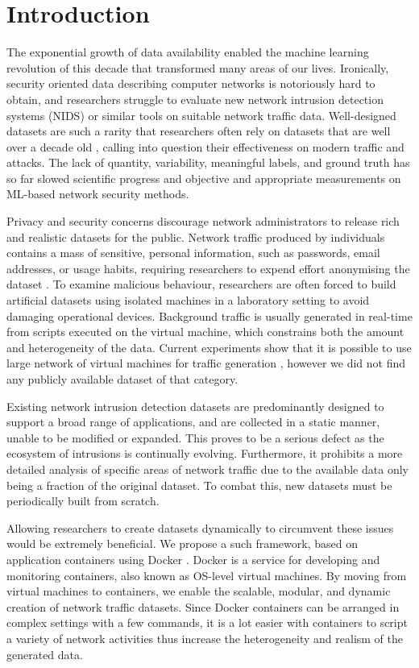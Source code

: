 \section{Introduction}


The exponential growth of data availability enabled the machine learning revolution of this decade that transformed many areas of our lives. Ironically, security oriented data describing computer networks is notoriously hard to obtain, and researchers struggle to evaluate new network intrusion detection systems (NIDS) or similar tools on suitable network traffic data.
Well-designed datasets are such a rarity that researchers often rely on datasets that are well over a decade old \cite{tavallaee2009detailed, kayacik2005selecting}, calling into question their effectiveness on modern traffic and attacks. The lack of quantity, variability, meaningful labels, and ground truth has so far slowed scientific progress and objective and appropriate measurements on ML-based network security methods.


Privacy and security concerns discourage network administrators to release rich and realistic datasets for the public. Network traffic produced by individuals contains a mass of sensitive, personal information, such as passwords, email addresses, or usage habits, requiring researchers to expend effort anonymising the dataset \cite{mirsky2016sherlock}. To examine malicious behaviour, researchers are often forced to build artificial datasets using isolated machines in a laboratory setting to avoid damaging operational devices. Background traffic is usually generated in real-time from scripts executed on the virtual machine, which constrains both the amount and heterogeneity of the data. Current experiments show that it is possible to use large network of virtual machines for traffic generation \cite{crussell2019lessons,crussell2019virtually}, however we did not find any publicly available dataset of that category. 

Existing network intrusion detection datasets are predominantly designed to support a broad range of applications, and are collected in a static manner, unable to be modified or expanded. This proves to be a serious defect as the ecosystem of intrusions is continually evolving.
Furthermore, it prohibits a more detailed analysis of specific areas of network traffic due to the available data only being a fraction of the original dataset. To combat this, new datasets must be periodically built from scratch.

Allowing researchers to create datasets dynamically to circumvent these issues would be extremely beneficial. We propose a such framework, based on application containers using Docker \cite{docker}. Docker is a service for developing and monitoring containers, also known as OS-level virtual machines. 
By moving from virtual machines to containers, we enable the scalable, modular, and dynamic creation of network traffic datasets. Since Docker containers can be arranged in complex settings with a few commands, it is a lot easier with containers to script a variety of network activities thus increase the heterogeneity and realism of the generated data.

